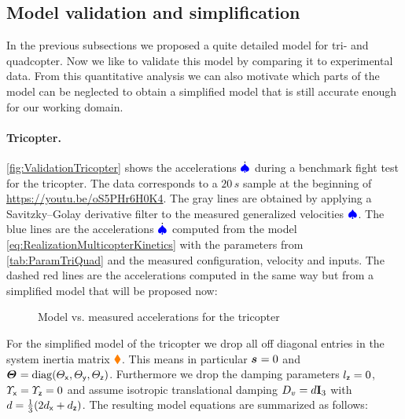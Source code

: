 \clearpage
\subsection{Model validation and simplification}
In the previous subsections we proposed a quite detailed model for tri- and quadcopter.
Now we like to validate this model by comparing it to experimental data.
From this quantitative analysis we can also motivate which parts of the model can be neglected to obtain a simplified model that is still accurate enough for our working domain.

\paragraph*{Tricopter.}
\autoref{fig:ValidationTricopter} shows the accelerations $\sysVeld$ during a benchmark fight test for the tricopter.
The data corresponds to a $20\,\unit{s}$ sample at the beginning of \url{https://youtu.be/oS5PHr6H0K4}.
The gray lines are obtained by applying a Savitzky–Golay derivative filter to the measured generalized velocities $\sysVel$.
The blue lines are the accelerations $\sysVeld$ computed from the model \eqref{eq:RealizationMulticopterKinetics} with the parameters from \autoref{tab:ParamTriQuad} and the measured configuration, velocity and inputs.
The dashed red lines are the accelerations computed in the same way but from a simplified model that will be proposed now:

\begin{figure}[p]
 \centering
 \footnotesize%
 
 \vspace{-20pt}
 \caption{Model vs. measured accelerations for the tricopter}
 \label{fig:ValidationTricopter}
\end{figure}

For the simplified model of the tricopter we drop all off diagonal entries in the system inertia matrix $\sysInertiaMat$.
This means in particular $\bodyCOM{}{}{} = 0$ and $\bodyMOI{}{}{} = \diag(\Jx, \Jy, \Jz)$.
Furthermore we drop the damping parameters $\lz=0$, $\sigx=\sigz=0$ and assume isotropic translational damping $D_v = \DampingSym \idMat[3]$ with $\DampingSym = \tfrac{1}{3}(2\dvx + \dvz)$.
The resulting model equations are summarized as follows:

